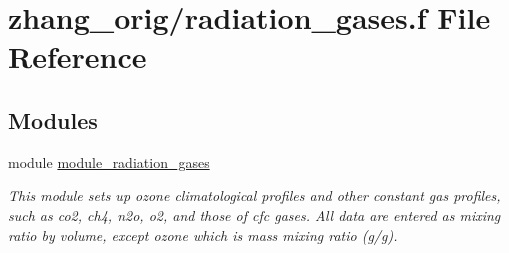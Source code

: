 \hypertarget{zhang__orig_2radiation__gases_8f}{}\section{zhang\+\_\+orig/radiation\+\_\+gases.f File Reference}
\label{zhang__orig_2radiation__gases_8f}
\subsection*{Modules}
\begin{DoxyCompactItemize}
\item 
module \hyperlink{namespacemodule__radiation__gases}{module\+\_\+radiation\+\_\+gases}
\begin{DoxyCompactList}\small\item\em This module sets up ozone climatological profiles and other constant gas profiles, such as co2, ch4, n2o, o2, and those of cfc gases. All data are entered as mixing ratio by volume, except ozone which is mass mixing ratio (g/g). \end{DoxyCompactList}\end{DoxyCompactItemize}
